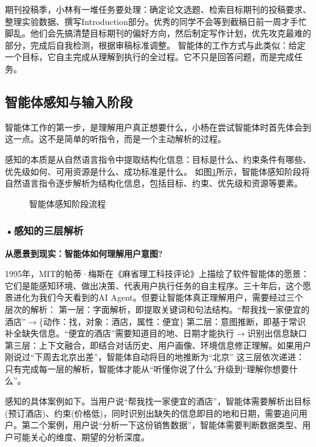 期刊投稿季，小林有一堆任务要处理：确定论文选题、检索目标期刊的投稿要求、整理实验数据、撰写Introduction部分。优秀的同学不会等到截稿日前一周才手忙脚乱。他们会先搞清楚目标期刊的偏好方向，然后制定写作计划，优先攻克最难的部分，完成后自我检测，根据审稿标准调整。
智能体的工作方式与此类似：给定一个目标，它自主完成从理解到执行的全过程。它不只是回答问题，而是完成任务。
\subsection{智能体感知与输入阶段}

智能体工作的第一步，是理解用户真正想要什么，小杨在尝试智能体时首先体会到这一点。这不是简单的听指令，而是一个主动解析的过程。 

感知的本质是从自然语言指令中提取结构化信息：目标是什么、约束条件有哪些、优先级如何、可用资源是什么、成功标准是什么。
如图\ref{fig:ch3_3_21}所示，智能体感知阶段将自然语言指令逐步解析为结构化信息，包括目标、约束、优先级和资源等要素。
\begin{figure}[H]
\centering
{}
\caption{智能体感知阶段流程}
\label{fig:ch3_3_21}
\end{figure}



\vfill
\begin{knowledgebox}

\subsubsection*{\textbf{•感知的三层解析}}
\textbf{从愿景到现实：智能体如何理解用户意图?} 

1995年，MIT的帕蒂·梅斯在《麻省理工科技评论》上描绘了软件智能体的愿景：它们是能感知环境、做出决策、代表用户执行任务的自主程序。三十年后，这个愿景进化为我们今天看到的AI Agent。但要让智能体真正理解用户，需要经过三个层次的解析：
第一层：字面解析，即提取关键词和句法结构。“帮我找一家便宜的酒店”$\rightarrow$\{动作：找，对象：酒店，属性：便宜\}
第二层：意图推断，即基于常识补全缺失信息。“便宜的酒店”需要知道目的地、日期才能执行$\rightarrow$识别出信息缺口
第三层：上下文融合，即结合对话历史、用户画像、环境信息修正理解。如果用户刚说过“下周去北京出差”，智能体自动将目的地推断为“北京”
这三层依次递进：只有完成每一层的解析，智能体才能从“听懂你说了什么”升级到“理解你想要什么”。
\end{knowledgebox}
\vspace{1em}

感知的具体案例如下。当用户说“帮我找一家便宜的酒店”，智能体需要解析出目标(预订酒店)、约束(价格低)，同时识别出缺失的信息即目的地和日期，需要追问用户。第二个案例，用户说“分析一下这份销售数据”，智能体需要判断数据类型、用户可能关心的维度、期望的分析深度。


